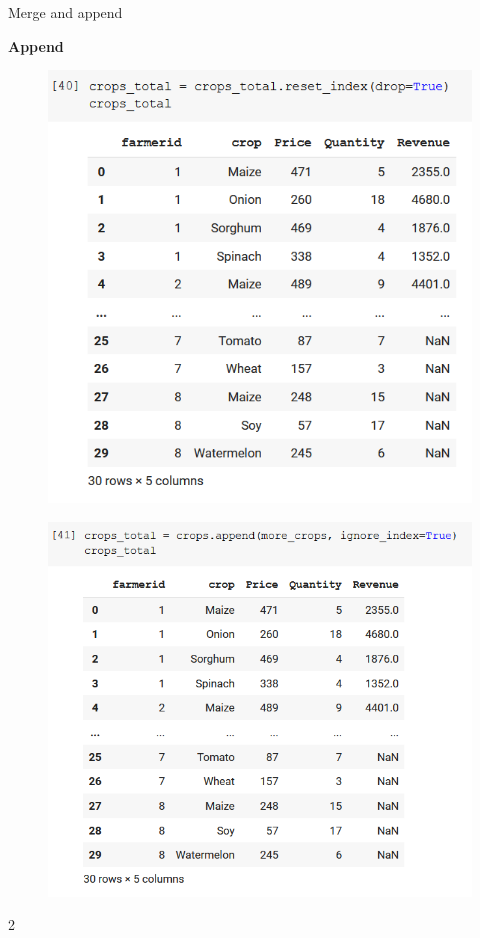 \documentclass[aspectratio=169]{beamer}
\begin{document}
\begin{frame}{Merge and append}

	\textbf{Append}

	\begin{multicols}{2}

		\begin{figure}
			\centering
			\includegraphics[width=0.87\linewidth]{img/crops_total_reset_index.png}
		\end{figure}
		\begin{figure}
			\centering
			\includegraphics[width=\linewidth]{img/crops_total_ignore_index.png}
		\end{figure}

	\end{multicols}{2}

\end{frame}
\end{document}

